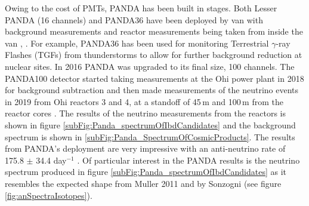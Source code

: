 Owing to the cost of PMTs, PANDA has been built in stages.  Both Lesser PANDA (16 channels) and PANDA36 have been deployed by van with background measurements and reactor measurements being taken from inside the van \cite{PANDA_2012}, \cite{PANDA_2014}. For example, PANDA36 has been used for monitoring Terrestrial $\gamma$-ray Flashes (TGFs) from thunderstorms to allow for further background reduction at nuclear sites\cite{PANDA_tgf}. In 2016 PANDA was upgraded to its final size, 100 channels. The PANDA100 detector started taking measurements at the Ohi power plant in 2018 for background subtraction and then made measurements of the neutrino events in 2019 from Ohi reactors 3 and 4, at a standoff of 45\,m and 100\,m from the reactor cores \cite{Iwata_2019}. The results of the neutrino measurements from the reactors is shown in figure \ref{subFig:Panda_spectrumOfIbdCandidates} and the background spectrum is shown in \ref{subFig:Panda_SpectrumOfCosmicProducts}. The results from PANDA's deployment are very impressive with an anti-neutrino rate of 175.8 $\pm$ 34.4 day$^{-1}$ \cite{IIRIE_Panda_2021}. Of particular interest in the PANDA results is the neutrino spectrum produced in figure \ref{subFig:Panda_spectrumOfIbdCandidates} as it resembles the expected shape from Muller 2011 \cite{Mueller_2011} and by Sonzogni \cite{sonzogni_nucStrcutre_2015} (see figure \ref{fig:anSpectraIsotopes}).

